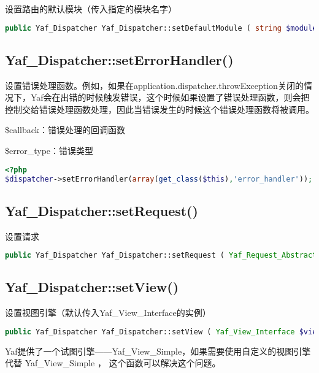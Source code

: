 设置路由的默认模块（传入指定的模块名字）

\begin{lstlisting}[language=PHP]
public Yaf_Dispatcher Yaf_Dispatcher::setDefaultModule ( string $module )
\end{lstlisting}

\subsection{Yaf\_Dispatcher::setErrorHandler()}

设置错误处理函数。例如，如果在application.dispatcher.throwException关闭的情况下，Yaf会在出错的时候触发错误，这个时候如果设置了错误处理函数，则会把控制交给错误处理函数处理，因此当错误发生的时候这个错误处理函数将被调用。

\begin{compactitem}
\item \$callback：错误处理的回调函数
\item \$error\_type：错误类型
\end{compactitem}



\begin{lstlisting}[language=PHP]
<?php
$dispatcher->setErrorHandler(array(get_class($this),'error_handler'));
\end{lstlisting}


\subsection{Yaf\_Dispatcher::setRequest()}

设置请求

\begin{lstlisting}[language=PHP]
public Yaf_Dispatcher Yaf_Dispatcher::setRequest ( Yaf_Request_Abstract $request )
\end{lstlisting}


\subsection{Yaf\_Dispatcher::setView()}

设置视图引擎（默认传入Yaf\_View\_Interface的实例）

\begin{lstlisting}[language=PHP]
public Yaf_Dispatcher Yaf_Dispatcher::setView ( Yaf_View_Interface $view )
\end{lstlisting}

Yaf提供了一个试图引擎——Yaf\_View\_Simple，如果需要使用自定义的视图引擎代替 Yaf\_View\_Simple ， 这个函数可以解决这个问题。


